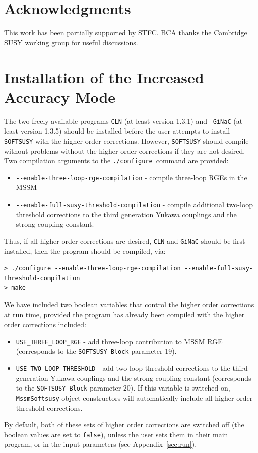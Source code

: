 \documentclass[final,3p,times,pdflatex]{elsarticle}
\def\code#1{{\tt #1}}
\begin{document}
\section*{Acknowledgments}
This work has been partially supported by STFC. BCA thanks the Cambridge SUSY
working group for useful discussions.

\appendix

\section{Installation of the Increased Accuracy Mode}
\label{sec:install}

The two freely available programs {\tt CLN} (at least version 1.3.1) and {\tt
  GiNaC} (at least version 1.3.5) should be installed before the user attempts
to install {\tt SOFTSUSY} with the higher order corrections. However, 
{\tt SOFTSUSY} should compile without problems without the higher order
corrections if they are not desired. 
Two compilation arguments to the {\tt ./configure}~command are provided:
\begin{itemize}
	\item[] \verb|--enable-three-loop-rge-compilation| - compile three-loop RGEs in the MSSM 
	\item[] \verb|--enable-full-susy-threshold-compilation| - compile
          additional two-loop threshold corrections to the third generation
          Yukawa couplings and the strong coupling constant.
\end{itemize}
Thus, if all higher order corrections are desired, {\tt CLN} and {\tt GiNaC}
should be first installed, then 
the program should be
compiled, via:
\begin{verbatim}
> ./configure --enable-three-loop-rge-compilation --enable-full-susy-threshold-compilation
> make
\end{verbatim}

We have included two boolean variables that control the higher order
corrections  at run time, provided the program has already been compiled with 
the higher order corrections included:
\begin{itemize}
	\item \verb|USE_THREE_LOOP_RGE|  - add three-loop contribution to
          MSSM RGE (corresponds to the \code{SOFTSUSY Block} parameter 19). 
	\item \verb|USE_TWO_LOOP_THRESHOLD| - add two-loop threshold
          corrections to the third generation Yukawa couplings and the strong
          coupling constant 
          (corresponds to the \code{SOFTSUSY Block} parameter 20). If this
          variable is switched on, {\tt MssmSoftsusy} object constructors will 
          automatically include all higher order threshold corrections.
\end{itemize}
By default, both of these sets of higher order corrections are switched off 
(the boolean values are set to {\tt false}), unless the user sets them in
their main program, or in the input parameters (see Appendix~\ref{sec:run}). 
\end{document}
